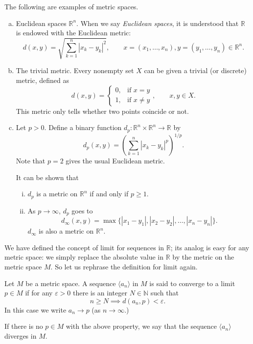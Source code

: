 The following are examples of metric spaces.
\begin{enumerate}[(a)]
  \item Euclidean spaces $\mathbb{R}^n$.  When we say \emph{Euclidean spaces}, it is understood that $\mathbb{R}$ is endowed with the Euclidean metric:
    \[
      d(x,y) = \sqrt{ \sum_{k=1}^n |x_k - y_k|^2 }, \qquad
      x = (x_1,\dots, x_n), y = (y_1, \dots, y_n) \in \mathbb{R}^n.
    \]

  \item The trivial metric.  Every nonempty set $X$ can be given a trivial (or discrete) metric, defined as
    \[
      d(x,y) = 
      \begin{cases}
	0, & \text{if $x=y$} \\
	1, & \text{if $x\ne y$}
      \end{cases}, \qquad x, y \in X.
    \]
    This metric only tells whether two points coincide or not.
  \item Let $p > 0$.  Define a binary function $d_p : \mathbb{R}^n \times \mathbb{R}^n \to \mathbb{R}$ by
    \[
      d_p(x,y) = \left( \sum_{k=1}^n |x_k-y_k|^p \right)^{1/p}.
    \]
    Note that $p=2$ gives the usual Euclidean metric.
    
    It can be shown that
    \begin{enumerate}[(i)]
      \item $d_p$ is a metric on $\mathbb{R}^n$ if and only if $p \geqslant 1$.
      \item As $p \to \infty$, $d_p$ goes to
	\[
	  d_\infty(x,y) = \max \{ |x_1-y_1|, |x_2-y_2|, \dots, |x_n-y_n| \}.
	\]
	$d_\infty$ is also a metric on $\mathbb{R}^n$.
    \end{enumerate}
\end{enumerate}

We have defined the concept of limit for sequences in $\mathbb{R}$; its analog is easy for any metric space: we simply replace the absolute value in $\mathbb{R}$ by the metric on the metric space $M$.
So let us rephrase the definition for limit again.

\begin{defn}
  Let $M$ be a metric space.  A sequence $\langle a_n \rangle$ in $M$ is said to \textsf{converge} to a limit $p \in M$ if for any $\varepsilon > 0$ there is an integer $N \in \mathbb{N}$ such that
  \[
    n \geqslant N \implies d(a_n, p) < \varepsilon.
  \]
  In this case we write $a_n \to p$ (as $n \to \infty$.)

  If there is no $p \in M$ with the above property, we say that the sequence $\langle a_n \rangle$ \textsf{diverges} in $M$.
\end{defn}

